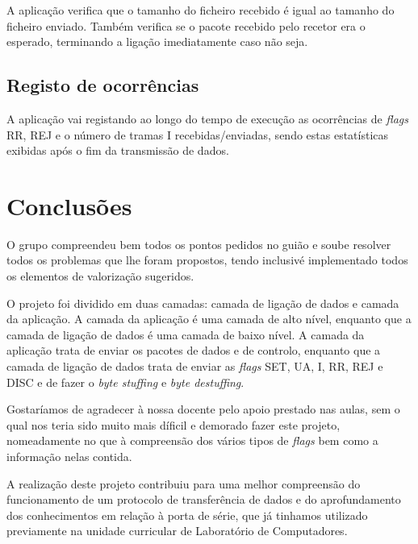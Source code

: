 \documentclass[11pt,a4paper,reqno]{article}
\numberwithin{equation}{section}
\begin{document}
A aplicação verifica que o tamanho do ficheiro recebido é igual ao tamanho do ficheiro enviado. Também verifica se o pacote recebido pelo recetor era o esperado, terminando a ligação imediatamente caso não seja.

\subsection{Registo de ocorrências}

A aplicação vai registando ao longo do tempo de execução as ocorrências de \textit{flags} RR, REJ e o número de tramas I recebidas/enviadas, sendo estas estatísticas exibidas após o fim da transmissão de dados.



\section{Conclusões}

O grupo compreendeu bem todos os pontos pedidos no guião e soube resolver todos os problemas que lhe foram propostos, tendo inclusivé implementado todos os elementos de valorização sugeridos.

O projeto foi dividido em duas camadas: camada de ligação de dados e camada da aplicação. A camada da aplicação é uma camada de alto nível, enquanto que a camada de ligação de dados é uma camada de baixo nível. A camada da aplicação trata de enviar os pacotes de dados e de controlo, enquanto que a camada de ligação de dados trata de enviar as \textit{flags} SET, UA, I, RR, REJ e DISC e de fazer o \textit{byte stuffing} e \textit{byte destuffing}.

Gostaríamos de agradecer à nossa docente pelo apoio prestado nas aulas, sem o qual nos teria sido muito mais díficil e demorado fazer este projeto, nomeadamente no que à compreensão dos vários tipos de \textit{flags} bem como a informação nelas contida.

A realização deste projeto contribuiu para uma melhor compreensão do funcionamento de um protocolo de transferência de dados e do aprofundamento dos conhecimentos em relação à porta de série, que já tinhamos utilizado previamente na unidade curricular de Laboratório de Computadores.



\end{document}
